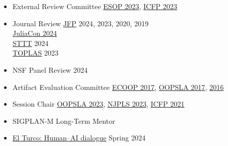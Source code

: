\documentclass[11pt]{article}
\begin{document}
\begin{itemize}
  \item {External Review Committee} \hfill \href{https://etaps.org/2023/esop}{ESOP 2023},
                                           \href{https://icfp23.sigplan.org/}{ICFP 2023}
  \item {Journal Review}
           \hfill \href{https://www.cambridge.org/core/journals/journal-of-functional-programming}{JFP} 2024, 2023, 2020, 2019 \\ %
    \hbox{}\hfill \href{https://juliacon.org/2024/}{JuliaCon 2024} \\
    \hbox{}\hfill \href{https://link.springer.com/journal/10009}{STTT} 2024 \\
    \hbox{}\hfill \href{https://dl.acm.org/journal/toplas}{TOPLAS} 2023 %
  \item {NSF Panel Review} \hfill {2024}
  \item {Artifact Evaluation Committee} \hfill \href{https://2017.ecoop.org/track/ecoop-2017-Artifacts}{ECOOP 2017},
                                               \href{https://2017.splashcon.org/track/splash-2017-OOPSLA-Artifacts}{OOPSLA 2017},
                                               \href{http://2016.splashcon.org/track/splash-2016-artifacts}{2016}
  \item {Session Chair} \hfill \href{https://2023.splashcon.org/program/program-splash-2023/?date=Wed%2025%20Oct%202023&room=Room%20II}{OOPSLA 2023},
                               \href{https://www.njpls.org/nov2023.html}{NJPLS 2023},
                               \href{https://icfp21.sigplan.org/program/program-icfp-2021/}{ICFP 2021}
                             \item {SIGPLAN-M Long-Term Mentor} \hfill {}
  \item \href{https://elturco.diemutstrebe.com}{El Turco: Human--AI dialogue} \hfill Spring 2024

\end{itemize}

\end{document}
